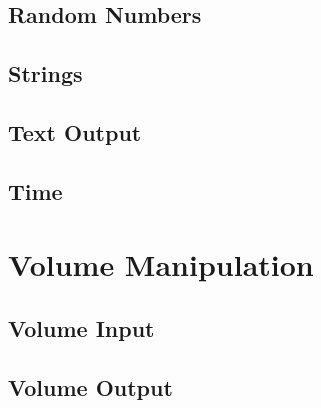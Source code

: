 \subsection{Random Numbers}

\subsection{Strings}

\subsection{Text Output}

\subsection{Time}

\section{Volume Manipulation}

\subsection{Volume Input}

\subsection{Volume Output}


